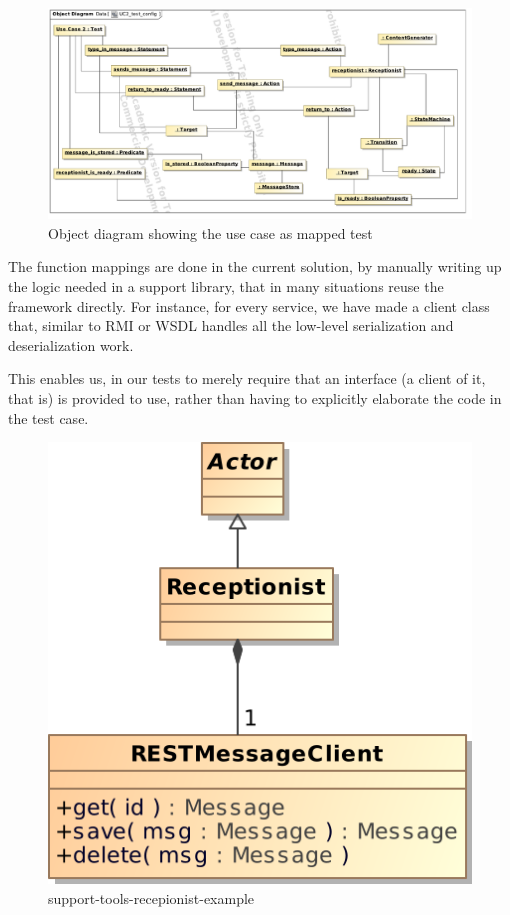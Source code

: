 \begin{figure}
 \includegraphics[scale=0.45]{img/uc2_test_config}
 \caption{Object diagram showing the use case as mapped test}
\end{figure}
The function mappings are done in the current solution, by manually writing up the logic needed in a support library, that in many situations reuse the framework directly. For instance, for every service, we have made a client class that, similar to RMI or WSDL handles all the low-level serialization and deserialization work. 

This enables us, in our tests to merely require that an interface (a client of it, that is) is provided to use, rather than having to explicitly elaborate the code in the test case.


\begin{figure}
 \centering
 \includegraphics[scale=0.60]{img/support-tools-recepionist-example}
 \caption{support-tools-recepionist-example}
 \label{fig:support-tools-recepionist-example}
\end{figure}

